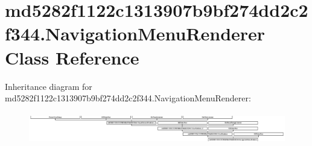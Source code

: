\hypertarget{classmd5282f1122c1313907b9bf274dd2c2f344_1_1NavigationMenuRenderer}{}\section{md5282f1122c1313907b9bf274dd2c2f344.\+Navigation\+Menu\+Renderer Class Reference}
\label{classmd5282f1122c1313907b9bf274dd2c2f344_1_1NavigationMenuRenderer}
Inheritance diagram for md5282f1122c1313907b9bf274dd2c2f344.\+Navigation\+Menu\+Renderer\+:\begin{figure}[H]
\begin{center}
\leavevmode
\includegraphics[height=1.372549cm]{classmd5282f1122c1313907b9bf274dd2c2f344_1_1NavigationMenuRenderer}
\end{center}
\end{figure}
